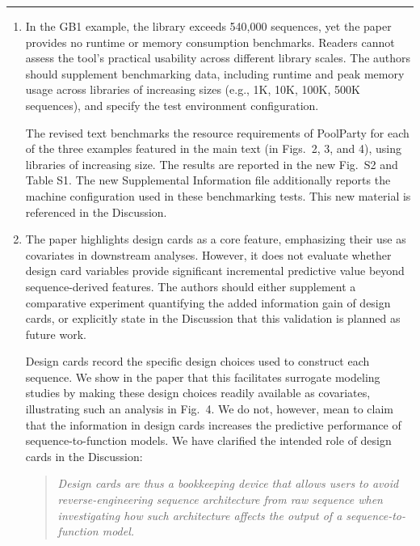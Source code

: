 \documentclass[11pt]{article}
\newenvironment{response}{\par\color{responseblue}}{\par}
\newenvironment{msquote}
  {\begin{quote}\color{responseblue}\itshape\noindent\ignorespaces}
  {\end{quote}}
\newcommand{\reviewersection}[1]{%
  \bigskip\par\noindent{\large\bfseries #1}\par\medskip\hrule\medskip}
\begin{document}
\reviewersection{Reviewer 1}

\begin{enumerate}
\item In the GB1 example, the library exceeds 540,000 sequences, yet the paper
provides no runtime or memory consumption benchmarks. Readers cannot assess the
tool's practical usability across different library scales. The authors should
supplement benchmarking data, including runtime and peak memory usage across
libraries of increasing sizes (e.g., 1K, 10K, 100K, 500K sequences), and specify
the test environment configuration.

\begin{response}
The revised text benchmarks the resource requirements of PoolParty for each of the three examples featured in the main text (in Figs.~2, 3, and 4), using libraries of increasing size. The results are reported in the new Fig.~S2 and Table S1. The new Supplemental Information file additionally reports the machine configuration used in these benchmarking tests. This new material is referenced in the Discussion. 
\end{response}

\item The paper highlights design cards as a core feature, emphasizing their use
as covariates in downstream analyses. However, it does not evaluate whether
design card variables provide significant incremental predictive value beyond
sequence-derived features. The authors should either supplement a comparative
experiment quantifying the added information gain of design cards, or explicitly
state in the Discussion that this validation is planned as future work.

\begin{response}
Design cards record the specific design choices used to construct each sequence. We show in the paper that this facilitates surrogate modeling studies by making these design choices readily available as covariates, illustrating such an analysis in Fig.~4. We do not, however, mean to claim that the information in design cards increases the predictive performance of sequence-to-function models. We have clarified the intended role of design cards in the Discussion:
\end{response}

\begin{msquote}
Design cards are thus a bookkeeping device that allows users to avoid reverse-engineering sequence architecture from raw sequence when investigating how such architecture affects the output of a sequence-to-function model.
\end{msquote}


\end{enumerate}
\end{document}
